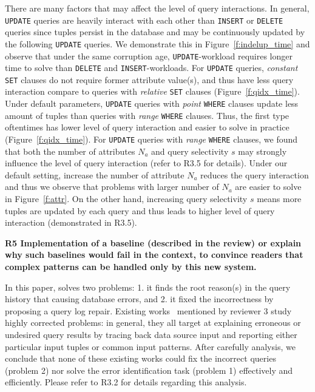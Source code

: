 There are many factors that may affect the level of query interactions. In general, \texttt{UPDATE} queries are heavily interact with each other than \texttt{INSERT} or \texttt{DELETE} queries since tuples persist in the database and may be continuously updated by the following \texttt{UPDATE} queries. We demonstrate this in Figure~\ref{f:indelup_time} and observe that under the same corruption age, \texttt{UPDATE}-workload requires longer time to solve than \texttt{DELETE} and \texttt{INSERT}-workloads. For \texttt{UPDATE} queries, \textit{constant} \texttt{SET} clauses do not require former attribute value(s), and thus have less query interaction compare to queries with \textit{relative} \texttt{SET} clauses (Figure~\ref{f:qidx_time}). Under default parameters, \texttt{UPDATE} queries with \textit{point} \texttt{WHERE} clauses update less amount of tuples than queries with \textit{range} \texttt{WHERE} clauses. Thus, the first type oftentimes has lower level of query interaction and easier to solve in practice (Figure~\ref{f:qidx_time}). For \texttt{UPDATE} queries with \textit{range} \texttt{WHERE} clauses, we found that both the number of attributes $N_a$ and query selectivity $s$ may strongly influence the level of query interaction (refer to R3.5 for details). Under our default setting, increase the number of attribute $N_a$ reduces the query interaction and thus we observe that problems with larger number of $N_a$ are easier to solve in Figure~\ref{f:attr}. On the other hand, increasing query selectivity $s$ means more tuples are updated by each query and thus leads to higher level of query interaction (demonstrated in R3.5).


\noindent \textbf{R5 Implementation of a baseline (described in the review) or explain why such baselines would fail in the context, to convince readers that complex patterns can be handled only by this new system.}

In this paper, \sys solves two problems: 1. it finds the root reason(s) in the query history that causing database errors, and 2. it fixed the incorrectness by proposing a query log repair. Existing works~\cite{Wu13, roy2014formal, chalamalla2014,meliou2011tracing} mentioned by reviewer 3 study highly corrected problems: in general, they all target at explaining erroneous or undesired query results by tracing back data source input and reporting either particular input tuples or common input patterns. After carefully analysis, we conclude that none of these existing works could fix the incorrect queries (problem 2) nor solve the error identification task (problem 1) effectively and efficiently.  Please refer to R3.2 for details regarding this analysis.

